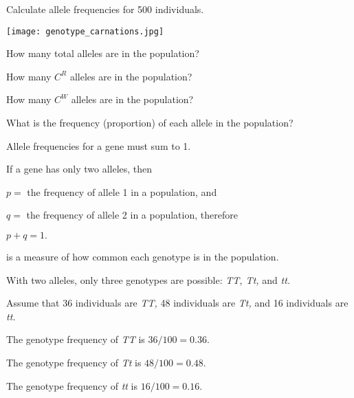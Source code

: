 \documentclass[t,handout]{beamer}  %
\begin{document}
%

\begin{frame}{Calculate allele frequencies for 500 individuals.}
	\vspace{-1\baselineskip}
	\begin{center}
		\texttt{[image: genotype\_carnations.jpg]}
	\end{center}
	
	\vspace{-\baselineskip}
	\hangpara How many total alleles are in the population?
	\pause
		
	\hangpara How many $C^R$ alleles are in the population?
	\pause

	\hangpara How many $C^W$ alleles are in the population?
	\pause

	\hangpara What is the frequency (proportion) of each allele in the population?
	
\end{frame}

\begin{frame}{Allele frequencies for a gene must sum to 1.}
	
	\hangpara If a gene has only two alleles, then

	\hangpara $p=$ the frequency of allele 1 in a population, and
	\pause
		
	\hangpara $q=$ the frequency of allele 2 in a population, therefore
	\pause

	\hangpara $p+q=1.$ 
	
	\vspace{\baselineskip}
	\hangpara {}
	
\end{frame}
%
\begin{frame}{ is a measure of how common each genotype is in the population.}

	\hangpara With two alleles, only three genotypes are possible: \textit{TT, Tt,} and \textit{tt.}
	
	\hangpara Assume that 36 individuals are \textit{TT,} 48 individuals are \textit{Tt,} and 16 individuals are \textit{tt.}
	
	\hangpara The genotype frequency of \textit{TT} is $36/100 = 0.36.$

	\hangpara The genotype frequency of \textit{Tt} is $48/100 = 0.48.$
	
	\hangpara The genotype frequency of \textit{tt} is $16/100 = 0.16.$

	

\end{frame}
\end{document}
